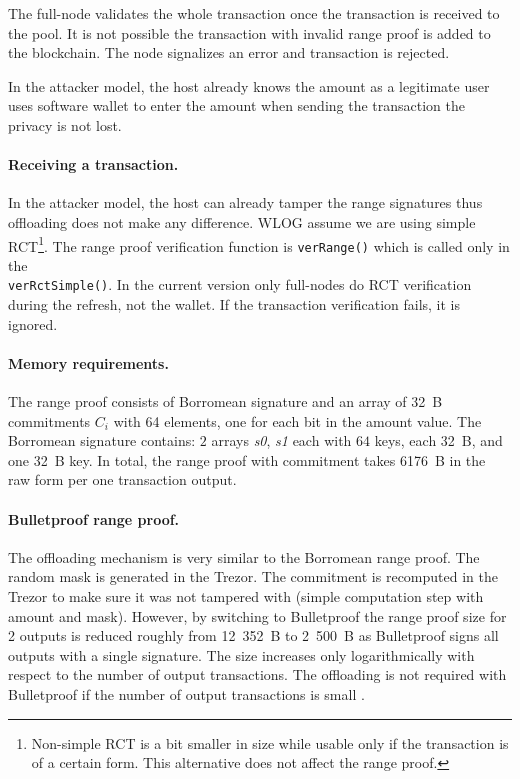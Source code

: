 \documentclass[]{article}
\begin{document}
The full-node validates the whole transaction once the transaction is received to the pool. It is not possible the transaction with invalid range proof is added to the blockchain. The node signalizes an error and transaction is rejected.

In the attacker model, the host already knows the amount as a legitimate user uses software wallet to enter the amount when sending the transaction the privacy is not lost.

\paragraph{Receiving a transaction.}
In the attacker model, the host can already tamper the range signatures thus offloading does not make any difference.
WLOG assume we are using simple RCT\footnote{Non-simple RCT is a bit smaller in size while usable only if the transaction is of a certain form. This alternative does not affect the range proof.}. The range proof verification function is \verb|verRange()| which is called only in the \\\verb|verRctSimple()|. In the current version only full-nodes do RCT verification during the refresh, not the wallet. If the transaction verification fails, it is ignored.

\paragraph{Memory requirements.} 
The range proof consists of Borromean signature and an array of 32~B commitments $C_i$ with 64 elements, one for each bit in the amount value. The Borromean signature contains: $2$ arrays \emph{s0}, \emph{s1} each with $64$ keys, each 32~B, and one 32~B key. In total, the range proof with commitment takes 6176~B in the raw form per one transaction output.

\paragraph{Bulletproof range proof.} The offloading mechanism is very similar to the Borromean range proof. The random mask is generated in the Trezor. The commitment is recomputed in the Trezor to make sure it was not tampered with (simple computation step with amount and mask). 
However, by switching to Bulletproof the range proof size for 2 outputs is reduced roughly from 12~352~B to 2~500~B as Bulletproof signs all outputs with a single signature. The size increases only logarithmically with respect to the number of output transactions. The offloading is not required with Bulletproof if the number of output transactions is small \cite{Bnz2017BulletproofsSP}.
\end{document}
